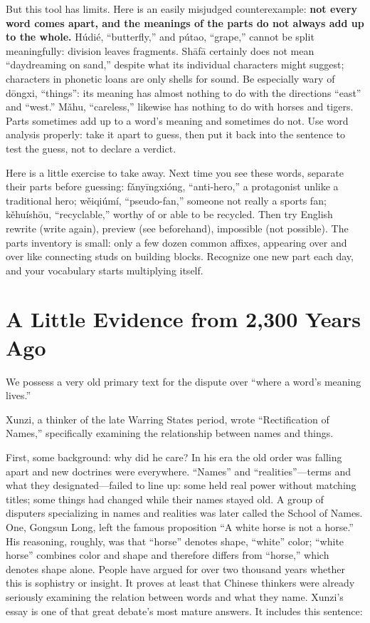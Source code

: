 But this tool has limits. Here is an easily misjudged counterexample: \textbf{not every word comes apart, and the meanings of the parts do not always add up to the whole.} Húdié, ``butterfly,'' and pútao, ``grape,'' cannot be split meaningfully: division leaves fragments. Shāfā certainly does not mean ``daydreaming on sand,'' despite what its individual characters might suggest; characters in phonetic loans are only shells for sound. Be especially wary of dōngxi, ``things'': its meaning has almost nothing to do with the directions ``east'' and ``west.'' Mǎhu, ``careless,'' likewise has nothing to do with horses and tigers. Parts sometimes add up to a word's meaning and sometimes do not. Use word analysis properly: take it apart to guess, then put it back into the sentence to test the guess, not to declare a verdict.

Here is a little exercise to take away. Next time you see these words, separate their parts before guessing: fǎnyīngxióng, ``anti-hero,'' a protagonist unlike a traditional hero; wěiqiúmí, ``pseudo-fan,'' someone not really a sports fan; kěhuíshōu, ``recyclable,'' worthy of or able to be recycled. Then try English rewrite (write again), preview (see beforehand), impossible (not possible). The parts inventory is small: only a few dozen common affixes, appearing over and over like connecting studs on building blocks. Recognize one new part each day, and your vocabulary starts multiplying itself.

\section{A Little Evidence from 2,300 Years Ago}
We possess a very old primary text for the dispute over ``where a word's meaning lives.''

Xunzi, a thinker of the late Warring States period, wrote ``Rectification of Names,'' specifically examining the relationship between names and things.

First, some background: why did he care? In his era the old order was falling apart and new doctrines were everywhere. ``Names'' and ``realities''---terms and what they designated---failed to line up: some held real power without matching titles; some things had changed while their names stayed old. A group of disputers specializing in names and realities was later called the School of Names. One, Gongsun Long, left the famous proposition ``A white horse is not a horse.'' His reasoning, roughly, was that ``horse'' denotes shape, ``white'' color; ``white horse'' combines color and shape and therefore differs from ``horse,'' which denotes shape alone. People have argued for over two thousand years whether this is sophistry or insight. It proves at least that Chinese thinkers were already seriously examining the relation between words and what they name. Xunzi's essay is one of that great debate's most mature answers. It includes this sentence:

